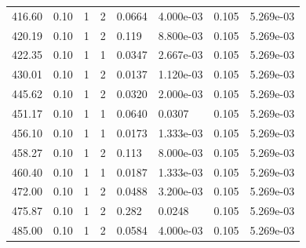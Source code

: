 \documentclass[preview]{standalone}
\begin{document}
{{{\begin{tabular}{L{1.2cm}C{1.2cm} C{0.3cm}C{0.5cm} C{1.4cm}C{1.4cm} C{1.4cm}C{1.4cm}}
  416.60  &  0.10  & 1     &  2 &  0.0664  & 4.000e-03  & 0.105 &  5.269e-03   \\ 
  420.19  &  0.10  & 1     &  2 &  0.119  & 8.800e-03  & 0.105 &  5.269e-03   \\ 
  422.35  &  0.10  & 1     &  1 &  0.0347  & 2.667e-03  & 0.105 &  5.269e-03   \\ 
  430.01  &  0.10  & 1     &  2 &  0.0137  & 1.120e-03  & 0.105 &  5.269e-03   \\ 
  445.62  &  0.10  & 1     &  2 &  0.0320  & 2.000e-03  & 0.105 &  5.269e-03   \\ 
  451.17  &  0.10  & 1     &  1 &  0.0640  & 0.0307  & 0.105 &  5.269e-03   \\ 
  456.10  &  0.10  & 1     &  1 &  0.0173  & 1.333e-03  & 0.105 &  5.269e-03   \\ 
  458.27  &  0.10  & 1     &  2 &  0.113  & 8.000e-03  & 0.105 &  5.269e-03   \\ 
  460.40  &  0.10  & 1     &  1 &  0.0187  & 1.333e-03  & 0.105 &  5.269e-03   \\ 
  472.00  &  0.10  & 1     &  2 &  0.0488  & 3.200e-03  & 0.105 &  5.269e-03   \\ 
  475.87  &  0.10  & 1     &  2 &  0.282  & 0.0248  & 0.105 &  5.269e-03   \\ 
  485.00  &  0.10  & 1     &  2 &  0.0584  & 4.000e-03  & 0.105 &  5.269e-03   \\ 
\hline 
\end{tabular} 

}}}
\end{document}

